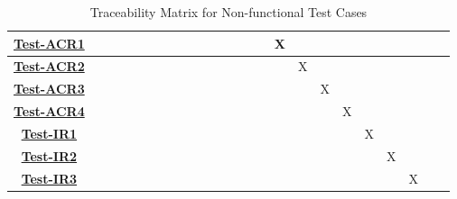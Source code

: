 \documentclass[12pt, titlepage]{article}
\begin{document}
\begin{table}[H]
\begin{adjustwidth}{-1.57in}{-1in}
{\begin{tabular}{c|c|c|c|c|c|c|c|c|c|c|c|c|c|c|c|c|c|c|c|c|c|c|c|}
\multicolumn{1}{|c|}{\hyperref[Test-ACR1]{\textbf{Test-ACR1}}}  &              &              &              &              &              &             &              &              &              &              &              &              &              &              &      X       &             &             &      &      & &    \\ \hline
\multicolumn{1}{|c|}{\hyperref[Test-ACR2]{\textbf{Test-ACR2}}}  &              &              &              &              &              &             &              &              &              &              &              &              &              &              &             &    X         &             &      &      & &   \\ \hline
\multicolumn{1}{|c|}{\hyperref[Test-ACR3]{\textbf{Test-ACR3}}}  &              &              &              &              &              &             &              &              &              &              &              &              &              &              &             &             &      X       &      &      & &   \\ \hline
\multicolumn{1}{|c|}{\hyperref[Test-ACR4]{\textbf{Test-ACR4}}}  &              &              &              &              &              &             &              &              &              &              &              &              &              &              &             &             &             &    X  &      & &   \\ \hline
\multicolumn{1}{|c|}{\hyperref[Test-IR1]{\textbf{Test-IR1}}}  &              &              &              &              &              &             &              &              &              &              &              &              &              &              &             &             &             &      &  X    & &   \\ \hline
\multicolumn{1}{|c|}{\hyperref[Test-IR2]{\textbf{Test-IR2}}}  &              &              &              &              &              &             &              &              &              &              &              &              &              &              &             &             &             &      &      &X&   \\ \hline
\multicolumn{1}{|c|}{\hyperref[Test-IR3]{\textbf{Test-IR3}}}  &              &              &              &              &              &             &              &              &              &              &              &              &              &              &             &             &             &      &      &&X \\ \hline
\end{tabular}}
\caption{Traceability Matrix for Non-functional Test Cases}
    \label{tab:my_label}
\end{adjustwidth}
\end{table}
\end{document}
